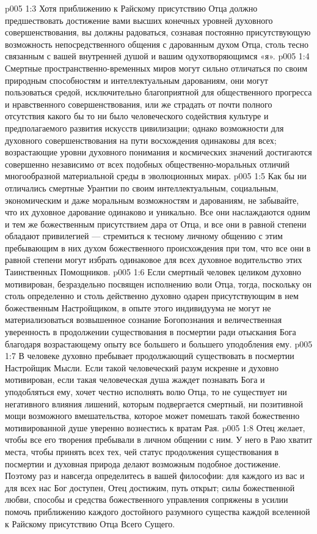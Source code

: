 \vs p005 1:3 \pc Хотя приближению к Райскому присутствию Отца должно предшествовать достижение вами высших конечных уровней духовного совершенствования, вы должны радоваться, сознавая постоянно присутствующую возможность непосредственного общения с дарованным духом Отца, столь тесно связанным с вашей внутренней душой и вашим одухотворяющимся «я».
\vs p005 1:4 Смертные пространственно\hyp{}временных миров могут сильно отличаться по своим природным способностям и интеллектуальным дарованиям, они могут пользоваться средой, исключительно благоприятной для общественного прогресса и нравственного совершенствования, или же страдать от почти полного отсутствия какого бы то ни было человеческого содействия культуре и предполагаемого развития искусств цивилизации; однако возможности для духовного совершенствования на пути восхождения одинаковы для всех; возрастающие уровни духовного понимания и космических значений достигаются совершенно независимо от всех подобных общественно\hyp{}моральных отличий многообразной материальной среды в эволюционных мирах.
\vs p005 1:5 Как бы ни отличались смертные Урантии по своим интеллектуальным, социальным, экономическим и даже моральным возможностям и дарованиям, не забывайте, что их духовное дарование одинаково и уникально. Все они наслаждаются одним и тем же божественным присутствием дара от Отца, и все они в равной степени обладают привилегией --- стремиться к тесному личному общению с этим пребывающим в них духом божественного происхождения при том, что все они в равной степени могут избрать одинаковое для всех духовное водительство этих Таинственных Помощников.
\vs p005 1:6 \pc Если смертный человек целиком духовно мотивирован, безраздельно посвящен исполнению воли Отца, тогда, поскольку он столь определенно и столь действенно духовно одарен присутствующим в нем божественным Настройщиком, в опыте этого индивидуума не могут не материализоваться возвышенное сознание Богопознания и величественная уверенность в продолжении существования в посмертии ради отыскания Бога благодаря возрастающему опыту все большего и большего уподобления ему.
\vs p005 1:7 В человеке духовно пребывает продолжающий существовать в посмертии Настройщик Мысли. Если такой человеческий разум искренне и духовно мотивирован, если такая человеческая душа жаждет познавать Бога и уподобляться ему, хочет честно исполнять волю Отца, то не существует ни негативного влияния лишений, которым подвергается смертный, ни позитивной мощи возможного вмешательства, которое может помешать такой божественно мотивированной душе уверенно вознестись к вратам Рая.
\vs p005 1:8 Отец желает, чтобы все его творения пребывали в личном общении с ним. У него в Раю хватит места, чтобы принять всех тех, чей статус продолжения существования в посмертии и духовная природа делают возможным подобное достижение. Поэтому раз и навсегда определитесь в вашей философии: для каждого из вас и для всех нас Бог доступен, Отец достижим, путь открыт; силы божественной любви, способы и средства божественного управления сопряжены в усилии помочь приближению каждого достойного разумного существа каждой вселенной к Райскому присутствию Отца Всего Сущего.
